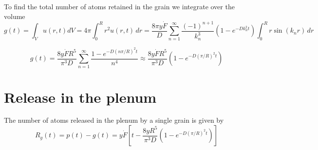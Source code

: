 \documentclass{article}
\begin{document}
To find the total number of atoms retained in the grain we integrate over the volume
\[
  g(t) = \int_V u(r,t) dV = 4\pi\int_0^R r^2 u(r,t) \, dr = \frac{8\pi y\dot{F}}{D}\sum_{n=1}^{\infty} \frac{(-1)^{n+1}}{k_n^3}\left(1 - e^{-Dk_n^2t}\right)\int_0^R r\sin(k_nr) \, dr
\]

\[
  g(t) = \frac{8y\dot{F}R^5}{\pi^3D}\sum_{n=1}^\infty \frac{1 - e^{-D\left( n\pi/R \right)^2t}} {n^4} \approx \frac{8y\dot{F}R^5}{\pi^3D}\left(1 - e^{-D\left( \pi/R \right)^2t} \right)
\]

\section{Release in the plenum}
The number of atoms released in the plenum by a single grain is given by
\[
  R_g(t) = p(t) - g(t) = y\dot{F}\left[ t - \frac{8yR^5}{\pi^3D}(1 - e^{-D\left( \pi/R \right)^2t})\right]
\]
\end{document}
